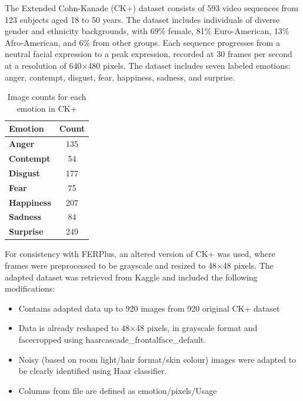 The Extended Cohn-Kanade (CK+) dataset consists of 593 video sequences from 123 subjects aged 18 to 50 years. The dataset includes individuals of diverse gender and ethnicity backgrounds, with 69\% female, 81\% Euro-American, 13\% Afro-American, and 6\% from other groups. Each sequence progresses from a neutral facial expression to a peak expression, recorded at 30 frames per second at a resolution of 640\(\times\)480 pixels. The dataset includes seven labeled emotions: anger, contempt, disgust, fear, happiness, sadness, and surprise.

\begin{table}[!htb]
    \centering{}
    \caption{Image counts for each emotion in CK+}
    \begin{tabular}{|l|c|}
        \hline
        \textbf{Emotion}   & \textbf{Count} \\ \hline
        \textbf{Anger}     & 135   \\ \hline
        \textbf{Contempt}  & 54    \\ \hline
        \textbf{Disgust}   & 177   \\ \hline
        \textbf{Fear}      & 75    \\ \hline
        \textbf{Happiness} & 207   \\ \hline
        \textbf{Sadness}   & 84    \\ \hline
        \textbf{Surprise}  & 249   \\ \hline
    \end{tabular}
\label{tab:emotion_counts_ck+}
\end{table}

For consistency with FERPlus, an altered version of CK+ was used, where frames were preprocessed to be grayscale and resized to 48\(\times\)48 pixels. The adapted dataset was retrieved from Kaggle and included the following modifications:

\begin{itemize}
    \item{} Contains adapted data up to 920 images from 920 original CK+ dataset
    \item{} Data is already reshaped to 48\(\times\)48 pixels, in grayscale format and facecropped using haarcascade\_frontalface\_default.
    \item{} Noisy (based on room light/hair format/skin colour) images were adapted to be clearly identified using Haar classifier.
    \item{} Columns from file are defined as emotion/pixels/Usage
\end{itemize}

